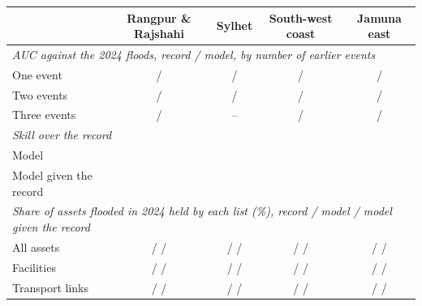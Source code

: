 \documentclass[11pt]{article}
\begin{document}
\begin{table}[tp]
\centering
\small
\footnotesize
\begin{tabular}{lcccc}
\toprule
 & Rangpur \& Rajshahi & Sylhet & South-west coast & Jamuna east \\
\midrule
\multicolumn{5}{l}{\emph{AUC against the 2024 floods, record / model, by number of earlier events}} \\
One event & \RRRecordLenOneRec{} / \RRRecordLenOneModel{} & \SylhetRecordLenOneRec{} / \SylhetRecordLenOneModel{} & \CoastalRecordLenOneRec{} / \CoastalRecordLenOneModel{} & \JamunaRecordLenOneRec{} / \JamunaRecordLenOneModel{} \\
Two events & \RRRecordLenTwoRec{} / \RRRecordLenTwoModel{} & \SylhetRecordLenTwoRec{} / \SylhetRecordLenTwoModel{} & \CoastalRecordLenTwoRec{} / \CoastalRecordLenTwoModel{} & \JamunaRecordLenTwoRec{} / \JamunaRecordLenTwoModel{} \\
Three events & \RRRecordLenThreeRec{} / \RRRecordLenThreeModel{} & -- & \CoastalRecordLenThreeRec{} / \CoastalRecordLenThreeModel{} & \JamunaRecordLenThreeRec{} / \JamunaRecordLenThreeModel{} \\
\midrule
\multicolumn{5}{l}{\emph{Skill over the record}} \\
Model & \RRSkillModel{} & \SylhetSkillModel{} & \CoastalSkillModel{} & \JamunaSkillModel{} \\
Model given the record & \RRSkillPastFeat{} & \SylhetSkillPastFeat{} & \CoastalSkillPastFeat{} & \JamunaSkillPastFeat{} \\
\midrule
\multicolumn{5}{l}{\emph{Share of assets flooded in 2024 held by each list (\%), record / model / model given the record}} \\
All assets & \RRPlanAllRecord{} / \RRPlanAllModel{} / \RRPlanAllBoth{} & \SylhetPlanAllRecord{} / \SylhetPlanAllModel{} / \SylhetPlanAllBoth{} & \CoastalPlanAllRecord{} / \CoastalPlanAllModel{} / \CoastalPlanAllBoth{} & \JamunaPlanAllRecord{} / \JamunaPlanAllModel{} / \JamunaPlanAllBoth{} \\
Facilities & \RRPlanFacilRecord{} / \RRPlanFacilModel{} / \RRPlanFacilBoth{} & \SylhetPlanFacilRecord{} / \SylhetPlanFacilModel{} / \SylhetPlanFacilBoth{} & \CoastalPlanFacilRecord{} / \CoastalPlanFacilModel{} / \CoastalPlanFacilBoth{} & \JamunaPlanFacilRecord{} / \JamunaPlanFacilModel{} / \JamunaPlanFacilBoth{} \\
Transport links & \RRPlanTransRecord{} / \RRPlanTransModel{} / \RRPlanTransBoth{} & \SylhetPlanTransRecord{} / \SylhetPlanTransModel{} / \SylhetPlanTransBoth{} & \CoastalPlanTransRecord{} / \CoastalPlanTransModel{} / \CoastalPlanTransBoth{} & \JamunaPlanTransRecord{} / \JamunaPlanTransModel{} / \JamunaPlanTransBoth{} \\

\end{tabular}
\end{table}
\end{document}
